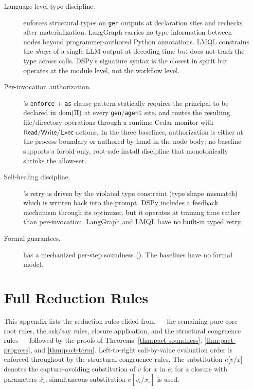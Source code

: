 \begin{description} \item[Language-level type discipline.]
\begin{sloppypar}\pact enforces structural types on \texttt{gen} outputs at
declaration sites and rechecks after materialization. LangGraph carries no type
information between nodes beyond programmer-authored Python annotations. LMQL
constrains the \emph{shape} of a single LLM output at decoding time but does not
track the type across calls. DSPy's signature syntax is the closest in spirit
but operates at the module level, not the workflow level.\end{sloppypar}
\item[Per-invocation authorization.] \begin{sloppypar}\pact's \texttt{enforce} +
\texttt{as}-clause pattern statically requires the principal to be declared in
$\mathrm{dom}(\Pi)$ at every \texttt{gen}/\allowbreak\texttt{agent} site, and
routes the resulting file/directory operations through a runtime Cedar monitor
with $\mathsf{Read}/\mathsf{Write}/\mathsf{Exec}$ actions. In the three
baselines, authorization is either at the process boundary or authored by hand
in the node body; no baseline supports a forbid-only, root-safe install
discipline that monotonically shrinks the allow-set.\end{sloppypar}
\item[Self-healing discipline.] \pact's retry is driven by the violated type
constraint (type shape mismatch) which is written back into the prompt. DSPy
includes a feedback mechanism through its optimizer, but it operates at training
time rather than per-invocation. LangGraph and LMQL have no built-in typed
retry.  \item[Formal guarantees.] \pact has a mechanized per-step soundness
(). The baselines have no formal model.
\end{description}

\section{Full Reduction Rules} \label{app:rules}

This appendix lists the reduction rules elided from  --- the remaining pure-core root rules, the ask/say rules, closure application, and the structural congruence rules --- followed by the proofs of Theorems~\ref{thm:pact-soundness}, \ref{thm:pact-progress}, and \ref{thm:pact-term}. Left-to-right call-by-value evaluation order is enforced throughout by the structural congruence rules. The substitution $e[v/x]$ denotes the capture-avoiding substitution of $v$ for $x$ in $e$; for a closure with parameters $\overline{x_i}$, simultaneous substitution $e[\overline{v_i/x_i}]$ is used.


